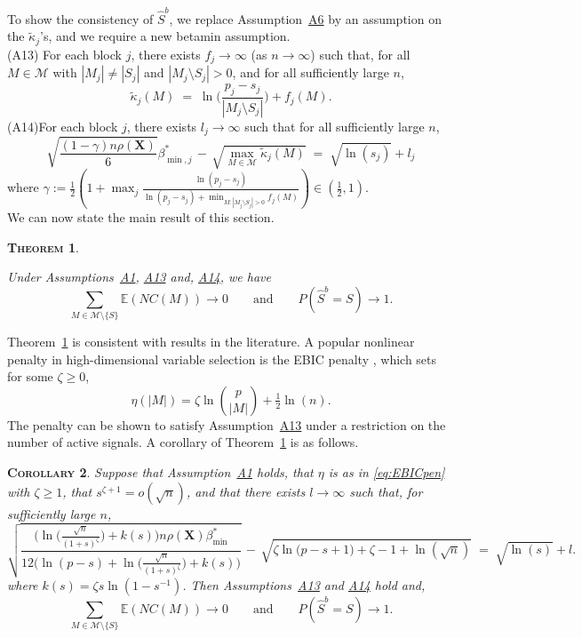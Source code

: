 \documentclass[bj,authoryear]{imsart}
\theoremstyle{plain}
\newtheorem{thm}{\textsc{Theorem}}[section]
\newtheorem{cor}[thm]{\textsc{Corollary}}
\newcommand{\E}{\mathbb{E}}
\newcommand{\M}{\mathcal{M}}
\newcommand{\bs}{\boldsymbol}
\begin{document}
To show the consistency of $\hat S^b$, we replace Assumption~\hyperlink{lab:A6}{A6} by an assumption on the $\tilde{\kappa}_{j}$'s, and we require a new betamin assumption.\\[5pt]
\hypertarget{lab:A13}{(A13)} \quad For each block $j$, there exists $f_j\to \infty$ (as $n\to \infty$) such that, for all $M \in \M$ with $|M_j| \neq |S_j|$ and $|M_j \setminus S_j| >0$, and for all sufficiently large $n$,
\begin{equation*}
    \tilde{\kappa}_{j}(M) \;=\;\ln\bigg(\frac{p_j-s_j}{|M_j \setminus S_j| }\bigg) + f_j(M).
\end{equation*}
\hypertarget{lab:A14}{(A14)}\quad For each block $j$, there exists $l_j\to \infty$ such that for all sufficiently large $n$,
    \begin{equation*}
        \sqrt{\frac{(1-\gamma) n\rho(\bs X)}{6}}\beta_{\min,j}^* \,- \,\sqrt{\max_{M\in \M}\tilde{\kappa}_{j}(M)} \;=\; \sqrt{\ln(s_j)} + l_j
    \end{equation*}
where $\gamma:=\frac12(1+\max_j \frac{\ln(p_j-s_j)}{\ln(p_j-s_j) +\min_{M: |M_j\setminus S_j|>0}f_j(M)})\in (\tfrac12,1)$.\\[5pt] 
We can now state the main result of this section.
\begin{thm}\label{theo:suffcondlinearmodelnonlinpen}

Under Assumptions~\hyperlink{lab:A1}{A1}, \hyperlink{lab:A13}{A13} and, \hyperlink{lab:A14}{A14}, we have
$$\sum_{M \in \M\setminus \{S\}}\E\left(NC(M)\right)\to 0 \qquad \mbox{and} \qquad P(\hat{S}^b = S) \to 1.$$
\end{thm}
Theorem~\ref{theo:suffcondlinearmodelnonlinpen} is consistent with results in the literature. A popular nonlinear penalty in high-dimensional variable selection is the EBIC penalty \cite{EBIC}, which sets for some $\zeta\geq 0$,
\begin{equation}\label{eq:EBICpen}
    \eta(|M|)=\zeta\ln{\binom{p}{|M|}} + \tfrac{1}{2}\ln(n).
\end{equation}
The penalty can be shown to satisfy Assumption~\hyperlink{lab:A13}{A13} under a restriction on the number of active signals. A corollary of Theorem~\ref{theo:suffcondlinearmodelnonlinpen} is as follows.
\begin{cor}\label{cor:ebic}
    Suppose that Assumption~\hyperlink{lab:A1}{A1} holds, that $\eta$ is as in \eqref{eq:EBICpen} with $\zeta\geq1$, that $s^{\zeta+1}=o(\sqrt{n})$, and that there exists $l\to \infty$ such that, for sufficiently large $n$,
    \begin{equation}\label{eq:betaminebic}
        \sqrt{\frac{ \big(\ln \big(\tfrac{\sqrt{n}}{(1+s)^{\zeta}}\big)+ k(s)\big)n\rho(\bs X)\beta_{\min}^*}{12\big(\ln(p-s)+ \ln \big(\tfrac{\sqrt{n}}{(1+s)^{\zeta}}\big)+k(s)\big)}}\,- \,\sqrt{\zeta\ln\big(p-s+1\big)+\zeta-1+\ln(\sqrt{n})} \;=\; \sqrt{\ln(s)} + l .
    \end{equation}
    where $k(s)=\zeta s\ln(1-s^{-1})$. Then Assumptions~\hyperlink{lab:A13}{A13} and \hyperlink{lab:A14}{A14} hold and, $$\sum_{M \in \M\setminus \{S\}}\E\left(NC(M)\right)\to 0 \qquad \mbox{and} \qquad P(\widehat{S}^b = S) \to 1.$$    
\end{cor}
\end{document}

